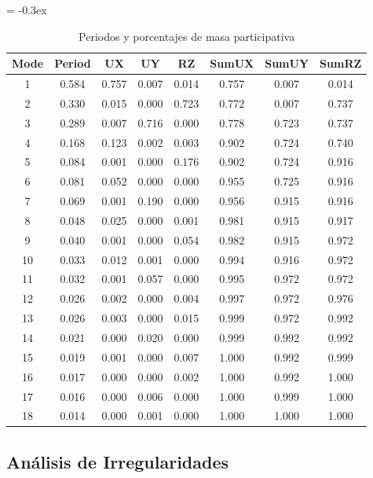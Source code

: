 \documentclass{article}%
\begin{document}
\begin{table}[H]%
\extrarowheight = -0.3ex%
\renewcommand{\arraystretch}{1.3}%
\centering%
\caption{Periodos y porcentajes de masa participativa}%
\begin{tabular}{cccccccc}
\toprule
Mode & Period & UX & UY & RZ & SumUX & SumUY & SumRZ \\
\midrule
1 & 0.584 & 0.757 & 0.007 & 0.014 & 0.757 & 0.007 & 0.014 \\
2 & 0.330 & 0.015 & 0.000 & 0.723 & 0.772 & 0.007 & 0.737 \\
3 & 0.289 & 0.007 & 0.716 & 0.000 & 0.778 & 0.723 & 0.737 \\
4 & 0.168 & 0.123 & 0.002 & 0.003 & 0.902 & 0.724 & 0.740 \\
5 & 0.084 & 0.001 & 0.000 & 0.176 & 0.902 & 0.724 & 0.916 \\
6 & 0.081 & 0.052 & 0.000 & 0.000 & 0.955 & 0.725 & 0.916 \\
7 & 0.069 & 0.001 & 0.190 & 0.000 & 0.956 & 0.915 & 0.916 \\
8 & 0.048 & 0.025 & 0.000 & 0.001 & 0.981 & 0.915 & 0.917 \\
9 & 0.040 & 0.001 & 0.000 & 0.054 & 0.982 & 0.915 & 0.972 \\
10 & 0.033 & 0.012 & 0.001 & 0.000 & 0.994 & 0.916 & 0.972 \\
11 & 0.032 & 0.001 & 0.057 & 0.000 & 0.995 & 0.972 & 0.972 \\
12 & 0.026 & 0.002 & 0.000 & 0.004 & 0.997 & 0.972 & 0.976 \\
13 & 0.026 & 0.003 & 0.000 & 0.015 & 0.999 & 0.972 & 0.992 \\
14 & 0.021 & 0.000 & 0.020 & 0.000 & 0.999 & 0.992 & 0.992 \\
15 & 0.019 & 0.001 & 0.000 & 0.007 & 1.000 & 0.992 & 0.999 \\
16 & 0.017 & 0.000 & 0.000 & 0.002 & 1.000 & 0.992 & 1.000 \\
17 & 0.016 & 0.000 & 0.006 & 0.000 & 1.000 & 0.999 & 1.000 \\
18 & 0.014 & 0.000 & 0.001 & 0.000 & 1.000 & 1.000 & 1.000 \\
\bottomrule
\end{tabular}
%
\end{table}

%
\subsection{Análisis de Irregularidades}%
\label{subsec:AnlisisdeIrregularidades}%
\end{document}
